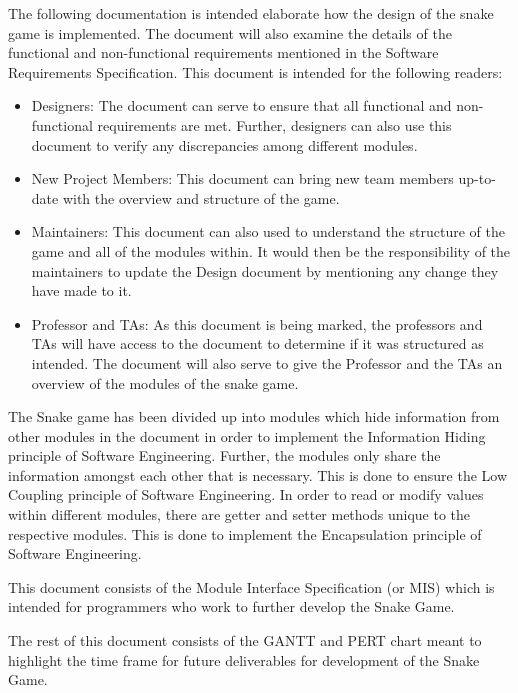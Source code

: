 \documentclass[12pt]{article}
\begin{document}
The following documentation is intended elaborate how the design of the snake game is implemented. The document will also examine the details of the functional and non-functional requirements mentioned in the Software Requirements Specification. This document is intended for the following readers:

\begin{itemize}
\item Designers: The document can serve to ensure that all functional and non-functional requirements are met. Further, designers can also use this document to verify any discrepancies among different modules.

\item New Project Members: This document can bring new team members up-to-date with the overview and structure of the game.

\item Maintainers: This document can also used to understand the structure of the game and all of the modules within. It would then be the responsibility of the maintainers to update the Design document by mentioning any change they have made to it.

\item Professor and TAs: As this document is being marked, the professors and TAs will have access to the document to determine if it was structured as intended. The document will also serve to give the Professor and the TAs an overview of the modules of the snake game.
\end{itemize}

The Snake game has been divided up into modules which hide information from other modules in the document in order to implement the Information Hiding principle of Software Engineering. Further, the modules only share the information amongst each other that is necessary. This is done to ensure the Low Coupling principle of Software Engineering. In order to read or modify values within different modules, there are getter and setter methods unique to the respective modules. This is done to implement the Encapsulation principle of Software Engineering.

This document consists of the Module Interface Specification (or MIS) which is intended for programmers who work to further develop the Snake Game.

The rest of this document consists of the GANTT and PERT chart meant to highlight the time frame for future deliverables for development of the Snake Game.
\end{document}
